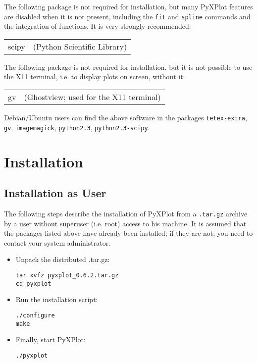\documentclass[a4paper,onecolumn,11pt]{book}
\begin{document}
The following package is not required for installation, but many PyXPlot
features are disabled when it is not present, including the \texttt{fit} and
\texttt{spline} commands and the integration of functions. It is very strongly
recommended:

\vspace{0.5cm}
\begin{tabular}{ll} 
scipy   & (Python Scientific Library) \\
\end{tabular}
\vspace{0.5cm}

The following package is not required for installation, but it is not possible
to use the X11 terminal, i.e. to display plots on screen, without it:

\vspace{0.5cm}
\begin{tabular}{ll}
gv      & (Ghostview; used for the X11 terminal) \\
\end{tabular}
\vspace{0.5cm}

Debian/Ubuntu users can find the above software in the packages \texttt{tetex-extra},
\texttt{gv}, \texttt{imagemagick}, \texttt{python2.3},
\texttt{python2.3-scipy}.

\section{Installation}

\subsection{Installation as User}

The following steps describe the installation of PyXPlot from a
\texttt{.tar.gz} archive by a user without superuser (i.e. root) access to his
machine. It is assumed that the packages listed above have already been
installed; if they are not, you need to contact your system administrator.

\begin{itemize}
\item Unpack the distributed .tar.gz:

\begin{verbatim}
tar xvfz pyxplot_0.6.2.tar.gz
cd pyxplot
\end{verbatim}

\item Run the installation script:

\begin{verbatim}
./configure
make
\end{verbatim}

\item Finally, start PyXPlot:

\begin{verbatim}
./pyxplot
\end{verbatim}

\end{itemize}
\end{document}
